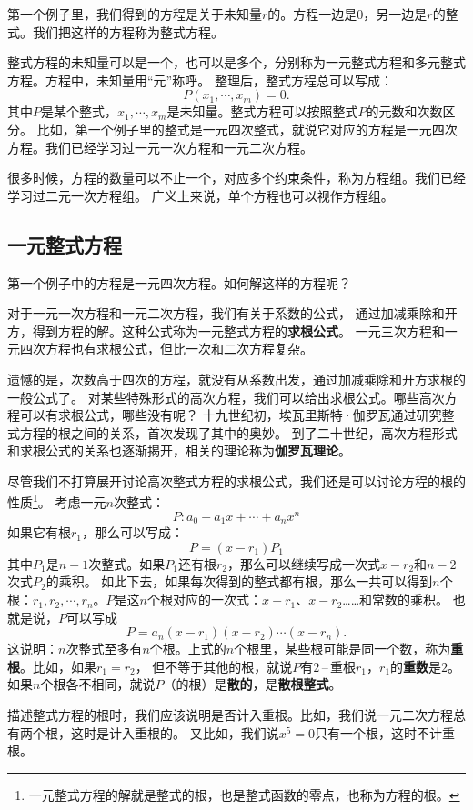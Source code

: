 \documentclass[12pt,UTF8]{ctexbook}
\theoremstyle{definition}
\theoremstyle{plain}
\begin{document}
第一个例子里，我们得到的方程是关于未知量$r$的。方程一边是$0$，另一边是$r$的整式。我们把这样的方程称为整式方程。

整式方程的未知量可以是一个，也可以是多个，分别称为一元整式方程和多元整式方程。方程中，未知量用“元”称呼。
整理后，整式方程总可以写成：
$$ P(x_1, \cdots ,x_m) = 0.$$
其中$P$是某个整式，$x_1, \cdots ,x_m$是未知量。整式方程可以按照整式$P$的元数和次数区分。
比如，第一个例子里的整式是一元四次整式，就说它对应的方程是一元四次方程。我们已经学习过一元一次方程和一元二次方程。

很多时候，方程的数量可以不止一个，对应多个约束条件，称为方程组。我们已经学习过二元一次方程组。
广义上来说，单个方程也可以视作方程组。

\subsection{一元整式方程}

第一个例子中的方程是一元四次方程。如何解这样的方程呢？

对于一元一次方程和一元二次方程，我们有关于系数的公式，
通过加减乘除和开方，得到方程的解。这种公式称为一元整式方程的\textbf{求根公式}。
一元三次方程和一元四次方程也有求根公式，但比一次和二次方程复杂。

遗憾的是，次数高于四次的方程，就没有从系数出发，通过加减乘除和开方求根的一般公式了。
对某些特殊形式的高次方程，我们可以给出求根公式。哪些高次方程可以有求根公式，哪些没有呢？
十九世纪初，埃瓦里斯特·伽罗瓦通过研究整式方程的根之间的关系，首次发现了其中的奥妙。
到了二十世纪，高次方程形式和求根公式的关系也逐渐揭开，相关的理论称为\textbf{伽罗瓦理论}。

尽管我们不打算展开讨论高次整式方程的求根公式，我们还是可以讨论方程的根的性质\footnote{一元整式方程的解就是整式的根，也是整式函数的零点，也称为方程的根。}。
考虑一元$n$次整式：
$$ P: a_0 + a_1 x + \cdots + a_n x^n $$
如果它有根$r_1$，那么可以写成：
$$ P = (x - r_1) P_1$$
其中$P_1$是$n-1$次整式。如果$P_1$还有根$r_2$，那么可以继续写成一次式$x - r_2$和$n-2$次式$P_2$的乘积。
如此下去，如果每次得到的整式都有根，那么一共可以得到$n$个根：$r_1, r_2, \cdots , r_n$。$P$是这$n$个根对应的一次式：$x - r_1$、$x - r_2$……和常数的乘积。
也就是说，$P$可以写成
$$ P = a_n (x - r_1)(x - r_2)\cdots (x - r_n).$$
这说明：$n$次整式至多有$n$个根。上式的$n$个根里，某些根可能是同一个数，称为\textbf{重根}。比如，如果$r_1 = r_2$，
但不等于其他的根，就说$P$有$2$\,–\,重根$r_1$，$r_1$的\textbf{重数}是$2$。如果$n$个根各不相同，就说$P$（的根）是\textbf{散的}，是\textbf{散根整式}。

描述整式方程的根时，我们应该说明是否计入重根。比如，我们说一元二次方程总有两个根，这时是计入重根的。
又比如，我们说$x^5 = 0$只有一个根，这时不计重根。
\end{document}
